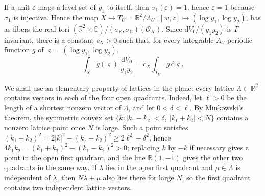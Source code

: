 If a unit $\varepsilon$ maps a level set of $y_1$ to itself, then $\sigma_1(\varepsilon)=1$, hence $\varepsilon=1$ because $\sigma_1$ is injective. Hence the map $X\to T_U=\mathbb R^2/\Lambda_U$, $[w,z]\mapsto(\log y_1,\log y_2)$, has as fibers the real tori $(\mathbb R^2\times\mathbb C)/(\sigma_{\mathbb R},\sigma_{\mathbb C})(\mathcal O_K)$. Since $\mathrm dV_0/(y_1y_2)$ is $\Gamma$-invariant, there is a constant $c_X>0$ such that, for every integrable $\Lambda_U$-periodic function $g$ of $\varsigma=(\log y_1,\log y_2)$,
\begin{equation}\label{eq:ot-fiber-integration}
 \int_Xg(\varsigma)\,\frac{\mathrm dV_0}{y_1y_2}
 =c_X\int_{T_U}g\,\mathrm d\varsigma.
\end{equation}

We shall use an elementary property of lattices in the plane: every lattice $\Lambda\subset\mathbb R^2$ contains vectors in each of the four open quadrants. Indeed, let $\ell>0$ be the length of a shortest nonzero vector of $\Lambda$, and let $0<\delta<\ell$. By Minkowski's theorem, the symmetric convex set $\{k:|k_1-k_2|<\delta,\ |k_1+k_2|<N\}$ contains a nonzero lattice point once $N$ is large. Such a point satisfies $(k_1+k_2)^2=2|k|^2-(k_1-k_2)^2\geq2\ell^2-\delta^2$, hence $4k_1k_2=(k_1+k_2)^2-(k_1-k_2)^2>0$; replacing $k$ by $-k$ if necessary gives a point in the open first quadrant, and the line $\mathbb R(1,-1)$ gives the other two quadrants in the same way. If $\lambda$ lies in the open first quadrant and $\mu\in\Lambda$ is independent of $\lambda$, then $N\lambda+\mu$ also lies there for large $N$, so the first quadrant contains two independent lattice vectors.

